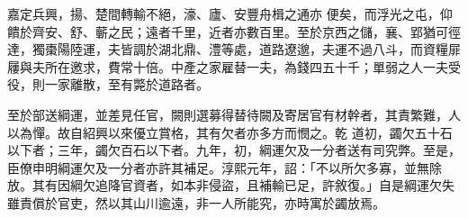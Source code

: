 \begin{pinyinscope}
 嘉定兵興，揚、楚間轉輸不絕，濠、廬、安豐舟楫之通亦
 便矣，而浮光之屯，仰饋於齊安、舒、蘄之民；遠者千里，近者亦數百里。至於京西之儲，襄、郢猶可徑達，獨棗陽陸運，夫皆調於湖北鼎、澧等處，道路遼邈，夫運不過八斗，而資糧屝屨與夫所在邀求，費常十倍。中產之家雇替一夫，為錢四五十千；單弱之人一夫受役，則一家離散，至有斃於道路者。



 至於部送綱運，並差見任官，闕則選募得替待闕及寄居官有材幹者，其責繁難，人以為憚。故自紹興以來優立賞格，其有欠者亦多方而憫之。乾
 道初，蠲欠五十石以下者；三年，蠲欠百石以下者。九年，初，綱運欠及一分者送有司究弊。至是，臣僚申明綱運欠及一分者亦許其補足。淳熙元年，詔：「不以所欠多寡，並無除放。其有因綱欠追降官資者，如本非侵盜，且補輸已足，許敘復。」自是綱運欠失雖責償於官吏，然以其山川逾遠，非一人所能究，亦時寓於蠲放焉。



\end{pinyinscope}